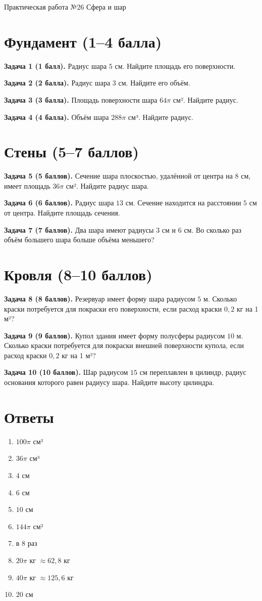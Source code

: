 \documentclass{umk-matematika}
\begin{document}
\maketitlepage
    {Практическая работа №26}
    {Сфера и шар}
    {}

\section{Фундамент (1--4 балла)}

\textbf{Задача 1 (1 балл).} Радиус шара $5$ см. Найдите площадь его поверхности.

\textbf{Задача 2 (2 балла).} Радиус шара $3$ см. Найдите его объём.

\textbf{Задача 3 (3 балла).} Площадь поверхности шара $64\pi$ см². Найдите радиус.

\textbf{Задача 4 (4 балла).} Объём шара $288\pi$ см³. Найдите радиус.

\section{Стены (5--7 баллов)}

\textbf{Задача 5 (5 баллов).} Сечение шара плоскостью, удалённой от центра на $8$ см, имеет площадь $36\pi$ см². Найдите радиус шара.

\textbf{Задача 6 (6 баллов).} Радиус шара $13$ см. Сечение находится на расстоянии $5$ см от центра. Найдите площадь сечения.

\textbf{Задача 7 (7 баллов).} Два шара имеют радиусы $3$ см и $6$ см. Во сколько раз объём большего шара больше объёма меньшего?

\section{Кровля (8--10 баллов)}

\textbf{Задача 8 (8 баллов).} Резервуар имеет форму шара радиусом $5$ м. Сколько краски потребуется для покраски его поверхности, если расход краски $0{,}2$ кг на 1 м²?

\textbf{Задача 9 (9 баллов).} Купол здания имеет форму полусферы радиусом $10$ м. Сколько краски потребуется для покраски внешней поверхности купола, если расход краски $0{,}2$ кг на 1 м²?

\textbf{Задача 10 (10 баллов).} Шар радиусом $15$ см переплавлен в цилиндр, радиус основания которого равен радиусу шара. Найдите высоту цилиндра.

\newpage
\section*{Ответы}

\begin{enumerate}
  \item $100\pi$ см²
  \item $36\pi$ см³
  \item $4$ см
  \item $6$ см
  \item $10$ см
  \item $144\pi$ см²
  \item в $8$ раз
  \item $20\pi$ кг $\approx 62{,}8$ кг
  \item $40\pi$ кг $\approx 125{,}6$ кг
  \item $20$ см
\end{enumerate}
\end{document}

